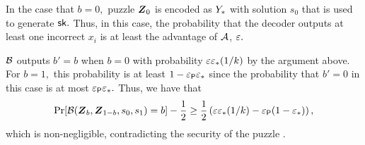 \begin{IEEEproof}
    In the case that $b = 0,$ puzzle $\boldsymbol{Z}_0$ is encoded as $Y_{*}$ with solution $s_0$ that is used to generate $\mathsf{sk}.$ 
    Thus, in this case, the probability that the decoder outputs at least one incorrect $x_i$ is at least the advantage of $\mathcal{A}$, $\varepsilon.$

    $\mathcal{B}$ outputs $b' = b$ when $b = 0$ with probability $\varepsilon \varepsilon_* (1/k)$ by the argument above. 
    For $b = 1,$ this probability is at least $1 - \varepsilon_{\mathsf{P}} \varepsilon_*$ since the probability that $b' = 0$ in this case is at most $\varepsilon_{\mathsf{P}} \varepsilon_*.$ 
    Thus, we have that 
    \[\Pr[\mathcal{B}(\boldsymbol{Z}_b,\boldsymbol{Z}_{1 -b},s_0,s_1) = b] - \frac{1}{2} \geq \frac{1}{2}\left(\varepsilon \varepsilon_* (1/k) - \varepsilon_{\mathsf{P}} (1 - \varepsilon_*)\right),\]
    which is non-negligible, contradicting the security of the puzzle \Puz.
\end{IEEEproof}